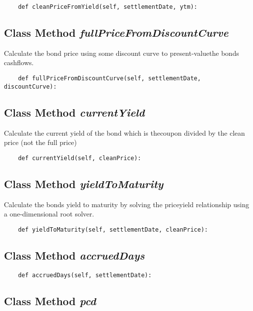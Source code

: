\documentclass[twoside,11pt]{book}
\begin{document}
\begin{lstlisting}
    def cleanPriceFromYield(self, settlementDate, ytm):
\end{lstlisting}

\subsection{Class Method {\it fullPriceFromDiscountCurve}}
Calculate the bond price using some discount curve to present-valuethe bonds cashflows. 

\begin{lstlisting}
    def fullPriceFromDiscountCurve(self, settlementDate, discountCurve):
\end{lstlisting}

\subsection{Class Method {\it currentYield}}
Calculate the current yield of the bond which is thecoupon divided by the clean price (not the full price)

\begin{lstlisting}
    def currentYield(self, cleanPrice):
\end{lstlisting}

\subsection{Class Method {\it yieldToMaturity}}
Calculate the bonds yield to maturity by solving the priceyield relationship using a one-dimensional root solver. 

\begin{lstlisting}
    def yieldToMaturity(self, settlementDate, cleanPrice):
\end{lstlisting}

\subsection{Class Method {\it accruedDays}}


\begin{lstlisting}
    def accruedDays(self, settlementDate):
\end{lstlisting}

\subsection{Class Method {\it pcd}}
\end{document}

